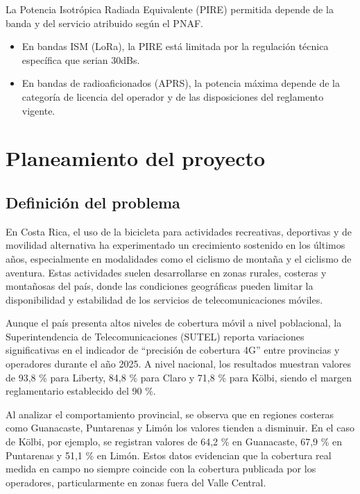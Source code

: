 \documentclass[conference]{IEEEtran}
\begin{document}
La Potencia Isotrópica Radiada Equivalente (PIRE) permitida depende de la banda y del servicio atribuido según el PNAF.

\begin{itemize}
    \item En bandas ISM (LoRa), la PIRE está limitada por la regulación técnica específica que serian 30dBs.
    \item En bandas de radioaficionados (APRS), la potencia máxima depende de la categoría de licencia del operador y de las disposiciones del reglamento vigente.
\end{itemize}

\section{Planeamiento del proyecto}

\subsection{Definición del problema}

En Costa Rica, el uso de la bicicleta para actividades recreativas, deportivas y de movilidad alternativa ha experimentado un crecimiento sostenido en los últimos años, especialmente en modalidades como el ciclismo de montaña y el ciclismo de aventura. Estas actividades suelen desarrollarse en zonas rurales, costeras y montañosas del país, donde las condiciones geográficas pueden limitar la disponibilidad y estabilidad de los servicios de telecomunicaciones móviles.

Aunque el país presenta altos niveles de cobertura móvil a nivel poblacional, la Superintendencia de Telecomunicaciones (SUTEL) \cite{sutel} reporta variaciones significativas en el indicador de “precisión de cobertura 4G” entre provincias y operadores durante el año 2025. A nivel nacional, los resultados muestran valores de 93,8 \% para Liberty, 84,8 \% para Claro y 71,8 \% para Kölbi, siendo el margen reglamentario establecido del 90 \%. 

Al analizar el comportamiento provincial, se observa que en regiones costeras como Guanacaste, Puntarenas y Limón los valores tienden a disminuir. En el caso de Kölbi, por ejemplo, se registran valores de 64,2 \% en Guanacaste, 67,9 \% en Puntarenas y 51,1 \% en Limón. Estos datos evidencian que la cobertura real medida en campo no siempre coincide con la cobertura publicada por los operadores, particularmente en zonas fuera del Valle Central.
\end{document}

